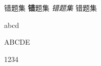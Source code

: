 \documentclass[fontset=windows]{ctexart}
\begin{document}
错题集
{\textbf 错题集}
{\itshape 错题集}
{\heiti 错题集}

abcd

ABCDE

1234


\label{LastPage}
\end{document}
